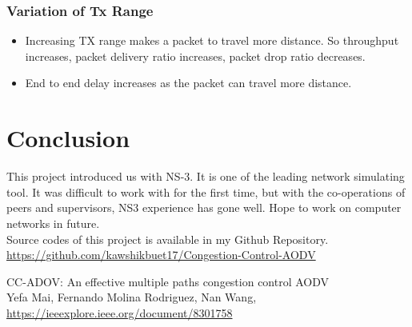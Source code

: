 \documentclass[12pt, a4paper]{article}
\begin{document}
\subsubsection{Variation of Tx Range}
\begin{itemize}
    \item Increasing TX range makes a packet to travel more distance. So throughput increases, packet delivery ratio increases, packet drop ratio decreases. 
    \item End to end delay increases as the packet can travel more distance.
\end{itemize}

\section{Conclusion}
This project introduced us with NS-3. It is one of the leading network simulating tool. It was difficult to work with for the first time, but with the co-operations of peers and supervisors, NS3 experience has gone well. Hope to work on computer networks in future.\\
Source codes of this project is available in my Github Repository. \url{https://github.com/kawshikbuet17/Congestion-Control-AODV}


\begin{thebibliography}{9}
CC-ADOV: An effective multiple paths congestion control AODV\\
Yefa Mai, Fernando Molina Rodriguez, Nan Wang, \url{https://ieeexplore.ieee.org/document/8301758}
\end{thebibliography}
\end{document}
